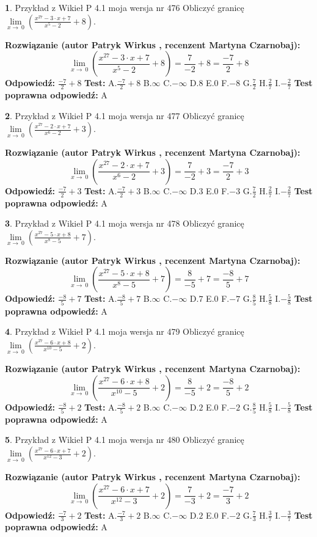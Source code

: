 \documentclass[12pt, a4paper]{article}
\theoremstyle{definition} %
\newtheorem{zad}{}
\newcommand{\zadStart}[1]{\begin{zad}#1\newline}
\newcommand{\zadStop}{\end{zad}}
\newcommand{\rozwStart}[2]{\noindent \textbf{Rozwiązanie (autor #1 , recenzent #2): }\newline}
\newcommand{\rozwStop}{\newline}
\newcommand{\odpStart}{\noindent \textbf{Odpowiedź:}\newline}
\newcommand{\odpStop}{\newline}
\newcommand{\testStart}{\noindent \textbf{Test:}\newline}
\newcommand{\testStop}{\newline}
\newcommand{\kluczStart}{\noindent \textbf{Test poprawna odpowiedź:}\newline}
\newcommand{\kluczStop}{\newline}
\begin{document}
\zadStart{Przykład z Wikieł P 4.1 moja wersja nr 476}
Obliczyć granicę $\lim\limits_{x\to\ 0}(\frac{x^{27}-3 \cdot x +7}{x^{5}-2}+8)$.
\zadStop
\rozwStart{Patryk Wirkus}{Martyna Czarnobaj}
$$\lim\limits_{x\to\ 0}(\frac{x^{27}-3 \cdot x +7}{x^{5}-2}+8)=\frac{7}{-2}+8=\frac{-7}{2}+8$$
\rozwStop
\odpStart
$\frac{-7}{2}+8$
\odpStop
\testStart
A.$\frac{-7}{2}+8$
B.$\infty$
C.$-\infty$
D.$8$
E.$0$
F.$-8$
G.$\frac{7}{2}$
H.$\frac{2}{7}$
I.$-\frac{2}{7}$
\testStop
\kluczStart
A
\kluczStop



\zadStart{Przykład z Wikieł P 4.1 moja wersja nr 477}
Obliczyć granicę $\lim\limits_{x\to\ 0}(\frac{x^{27}-2 \cdot x +7}{x^{6}-2}+3)$.
\zadStop
\rozwStart{Patryk Wirkus}{Martyna Czarnobaj}
$$\lim\limits_{x\to\ 0}(\frac{x^{27}-2 \cdot x +7}{x^{6}-2}+3)=\frac{7}{-2}+3=\frac{-7}{2}+3$$
\rozwStop
\odpStart
$\frac{-7}{2}+3$
\odpStop
\testStart
A.$\frac{-7}{2}+3$
B.$\infty$
C.$-\infty$
D.$3$
E.$0$
F.$-3$
G.$\frac{7}{2}$
H.$\frac{2}{7}$
I.$-\frac{2}{7}$
\testStop
\kluczStart
A
\kluczStop



\zadStart{Przykład z Wikieł P 4.1 moja wersja nr 478}
Obliczyć granicę $\lim\limits_{x\to\ 0}(\frac{x^{27}-5 \cdot x +8}{x^{8}-5}+7)$.
\zadStop
\rozwStart{Patryk Wirkus}{Martyna Czarnobaj}
$$\lim\limits_{x\to\ 0}(\frac{x^{27}-5 \cdot x +8}{x^{8}-5}+7)=\frac{8}{-5}+7=\frac{-8}{5}+7$$
\rozwStop
\odpStart
$\frac{-8}{5}+7$
\odpStop
\testStart
A.$\frac{-8}{5}+7$
B.$\infty$
C.$-\infty$
D.$7$
E.$0$
F.$-7$
G.$\frac{8}{5}$
H.$\frac{5}{8}$
I.$-\frac{5}{8}$
\testStop
\kluczStart
A
\kluczStop



\zadStart{Przykład z Wikieł P 4.1 moja wersja nr 479}
Obliczyć granicę $\lim\limits_{x\to\ 0}(\frac{x^{27}-6 \cdot x +8}{x^{10}-5}+2)$.
\zadStop
\rozwStart{Patryk Wirkus}{Martyna Czarnobaj}
$$\lim\limits_{x\to\ 0}(\frac{x^{27}-6 \cdot x +8}{x^{10}-5}+2)=\frac{8}{-5}+2=\frac{-8}{5}+2$$
\rozwStop
\odpStart
$\frac{-8}{5}+2$
\odpStop
\testStart
A.$\frac{-8}{5}+2$
B.$\infty$
C.$-\infty$
D.$2$
E.$0$
F.$-2$
G.$\frac{8}{5}$
H.$\frac{5}{8}$
I.$-\frac{5}{8}$
\testStop
\kluczStart
A
\kluczStop



\zadStart{Przykład z Wikieł P 4.1 moja wersja nr 480}
Obliczyć granicę $\lim\limits_{x\to\ 0}(\frac{x^{27}-6 \cdot x +7}{x^{12}-3}+2)$.
\zadStop
\rozwStart{Patryk Wirkus}{Martyna Czarnobaj}
$$\lim\limits_{x\to\ 0}(\frac{x^{27}-6 \cdot x +7}{x^{12}-3}+2)=\frac{7}{-3}+2=\frac{-7}{3}+2$$
\rozwStop
\odpStart
$\frac{-7}{3}+2$
\odpStop
\testStart
A.$\frac{-7}{3}+2$
B.$\infty$
C.$-\infty$
D.$2$
E.$0$
F.$-2$
G.$\frac{7}{3}$
H.$\frac{3}{7}$
I.$-\frac{3}{7}$
\testStop
\kluczStart
A
\kluczStop
\end{document}
